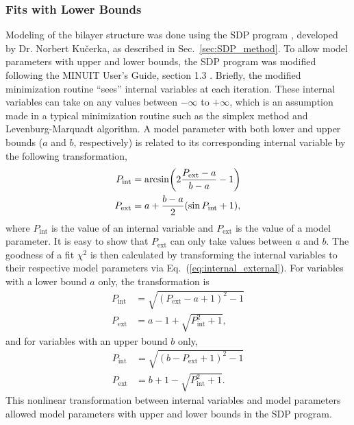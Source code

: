 \subsubsection{Fits with Lower Bounds}
Modeling of the bilayer structure was done using the SDP program \cite{Kucerka08},
developed by Dr. Norbert Ku\v{c}erka, 
as described in Sec.~\ref{sec:SDP_method}.
To allow model parameters with upper and lower bounds, the
SDP program was modified following the MINUIT User's Guide, section 1.3 
\cite{minuit}. 
Briefly, the modified minimization routine ``sees'' internal variables 
at each iteration. These internal variables can take on
any values between $-\infty$ to $+\infty$, which is an assumption made
in a typical minimization routine such as 
the simplex method and Levenburg-Marquadt algorithm.
A model parameter with both lower and upper bounds ($a$ and $b$, respectively) 
is related to its corresponding internal variable by the following transformation,
\begin{align}
  P_\textrm{int} &= \arcsin \mathopen{}\left( 2\frac{P_\textrm{ext}-a}{b-a}-1 \right)\mathclose{}  \\
  P_\textrm{ext} &= a + \frac{b-a}{2}(\sin P_\textrm{int}+1),
  \label{eq:internal_external}
\end{align}
where $P_\text{int}$ is the value of an internal variable and
$P_\text{ext}$ is the value of a model parameter. It is easy to show that
$P_\text{ext}$ can only take values between $a$ and $b$.
The goodness of a fit $\chi^2$ is then calculated by transforming the
internal variables to their respective model parameters via Eq.~(\ref{eq:internal_external}). 
For variables with a lower bound $a$ only, the transformation is
\begin{align}
  P_\textrm{int} &= \sqrt{(P_\textrm{ext}-a+1)^2 - 1} \\
  P_\textrm{ext} &= a - 1 + \sqrt{P_\textrm{int}^2+1}, 
\end{align}
and for variables with an upper bound $b$ only,
\begin{align}
  P_\textrm{int} &= \sqrt{(b-P_\textrm{ext}+1)^2 - 1} \\
  P_\textrm{ext} &= b + 1 - \sqrt{P_\textrm{int}^2+1}.
\end{align}
This nonlinear transformation between internal variables and model parameters 
allowed model parameters with upper and lower bounds in
the SDP program.

\newpage
